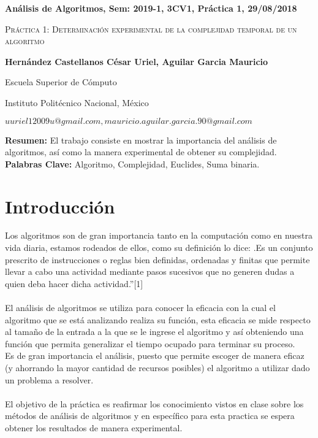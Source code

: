 \documentclass[12pt,twoside]{article}
\date{}
\begin{document}
\centerline{\bf An\'alisis de Algoritmos, Sem: 2019-1, 3CV1, Pr\'actica 1, 29/08/2018}
\centerline{}
\centerline{}
\begin{center}
\Large{\textsc{Pr\'actica 1: Determinaci\'on experimental de la complejidad temporal de un
algoritmo}}
\end{center}
\centerline{}
\centerline{\bf {Hern\'andez Castellanos C\'esar Uriel, Aguilar Garcia Mauricio}}
\centerline{}
\centerline{Escuela Superior de C\'omputo}
\centerline{Instituto Polit\'ecnico Nacional, M\'exico}
\centerline{$uuriel12009u@gmail.com, mauricio.aguilar.garcia.90@gmail.com$}
\newtheorem{Theorem}{\quad Theorem}[section]
\newtheorem{Definition}[Theorem]{\quad Definition}
\newtheorem{Corollary}[Theorem]{\quad Corollary}
\newtheorem{Lemma}[Theorem]{\quad Lemma}
\newtheorem{Example}[Theorem]{\quad Example}
\bigskip
\textbf{Resumen:} El trabajo consiste en mostrar la importancia del análisis de algoritmos, así como la manera experimental de obtener su complejidad.\\
{\bf Palabras Clave:} Algoritmo, Complejidad, Euclides, Suma binaria.
\section{Introducción}
Los algoritmos son de gran importancia tanto en la computación como en nuestra vida diaria, estamos rodeados de ellos, como su definición lo dice: .Es un conjunto prescrito de instrucciones o reglas bien definidas, ordenadas y finitas que permite llevar a cabo una actividad mediante pasos sucesivos que no generen dudas a quien deba hacer dicha actividad.”[1]\\
\\	El análisis de algoritmos se utiliza para conocer la eficacia con la cual el algoritmo que se está analizando realiza su función, esta eficacia se mide respecto al tamaño de la entrada a la que se le ingrese el algoritmo y así obteniendo una función que permita generalizar el tiempo ocupado para terminar su proceso.\\
	Es de gran importancia el análisis, puesto que permite escoger de manera eficaz (y ahorrando la mayor cantidad de recursos posibles) el algoritmo a utilizar dado un problema a resolver.\\
\\	El objetivo de la práctica es reafirmar los conocimiento vistos en clase sobre los métodos de análisis de algoritmos y en específico para esta practica se espera obtener los resultados de manera experimental.
\vspace{50 mm}
\end{document}
